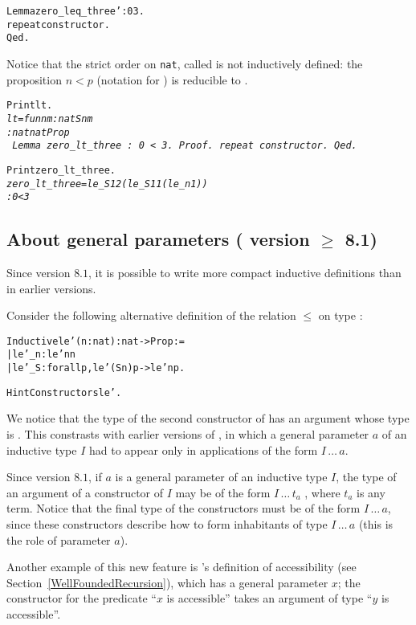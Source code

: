 \documentclass[11pt]{article}
\begin{document}
\begin{alltt}
Lemma zero_leq_three': 0 {\coqle} 3.
 repeat constructor.
Qed.
\end{alltt}

Notice that the strict order on \texttt{nat}, called 
is not inductively defined: the proposition $n<p$ (notation for )
is reducible to .

\begin{alltt}
Print lt.
\it
lt = fun n m : nat {\funarrow} S n {\coqle} m
     : nat {\arrow} nat {\arrow} Prop
\tt
Lemma zero_lt_three : 0 < 3.
Proof.
 repeat constructor.
Qed.

Print zero_lt_three.
\it zero_lt_three = le_S 1 2 (le_S 1 1 (le_n 1))
     : 0 < 3
\end{alltt}



\subsection{About general parameters (\coq{} version $\geq$ 8.1)}
\label{parameterstuff}

Since version $8.1$, it is possible to write more compact inductive definitions
than in earlier versions.

Consider the following alternative definition of the relation $\leq$ on
type :

\begin{alltt}
Inductive le'(n:nat):nat -> Prop :=
 | le'_n : le' n n
 | le'_S : forall p, le' (S n) p -> le' n p.

Hint Constructors le'.
\end{alltt}

We notice that the type of the second constructor of 
has an argument whose type is .
This constrasts with earlier versions
of {\coq}, in which a general parameter $a$ of an inductive
type $I$ had to appear only in applications of the form $I\,\dots\,a$.

Since version $8.1$, if $a$ is a general parameter of an inductive
type $I$, the type of an argument of a constructor of $I$ may be
of the form  $I\,\dots\,t_a$ , where $t_a$ is any term.
Notice that the final type of the constructors must be of the form
$I\,\dots\,a$, since these constructors describe how to form
inhabitants of type $I\,\dots\,a$ (this is the role of parameter $a$).

Another example of this new feature is {\coq}'s definition of accessibility
(see Section~\ref{WellFoundedRecursion}), which has a general parameter
$x$; the constructor for the predicate
``$x$ is accessible'' takes an  argument of type ``$y$ is accessible''.
\end{document}
